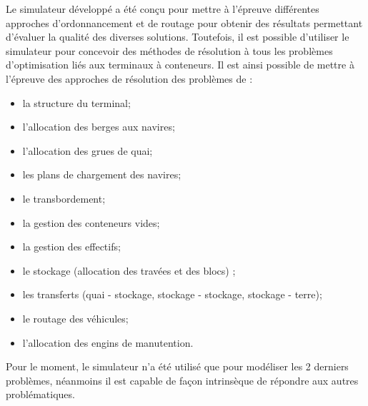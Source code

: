 Le simulateur développé a été conçu pour mettre à l'épreuve différentes approches d'ordonnancement et de routage pour obtenir des résultats permettant d'évaluer la qualité des diverses solutions. Toutefois, il est possible d'utiliser le simulateur pour concevoir des méthodes de résolution à tous les problèmes d'optimisation liés aux terminaux à conteneurs. Il est ainsi possible de mettre à l'épreuve des approches de résolution des problèmes de : 
\begin{itemize}
 \item la structure du terminal;
 \item l’allocation des berges aux navires;
 \item l’allocation des grues de quai;
 \item les plans de chargement des navires;
 \item le transbordement;
 \item la gestion des conteneurs vides;
 \item la gestion des effectifs;
 \item le stockage (allocation des travées et des blocs) ;
 \item les transferts (quai - stockage, stockage - stockage, stockage - terre);
 \item le routage des véhicules;
 \item l’allocation des engins de manutention.
\end{itemize}

Pour le moment, le simulateur n'a été utilisé que pour modéliser les 2 derniers problèmes, néanmoins il est capable de façon intrinsèque de répondre aux autres problématiques.
